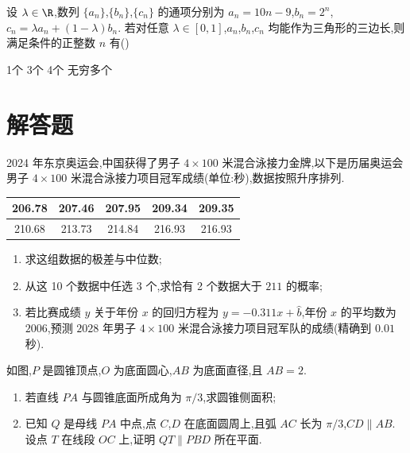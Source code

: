 \begin{problem}
设 \(\lambda\in\R\),数列 \(\{a_n\}\),\(\{b_n\}\),\(\{c_n\}\) 的通项分别为 \(a_n=10n-9\),\(b_n=2^n\),\(c_n=\lambda a_n+(1-\lambda)b_n\). 若对任意 \(\lambda\in[0,1]\),\(a_n\),\(b_n\),\(c_n\) 均能作为三角形的三边长,则满足条件的正整数 \(n\) 有(\quad)

\choices
    {1个}
    {3个}
    {4个}
    {无穷多个}
\end{problem}

\section{解答题}

\begin{problem}
2024 年东京奥运会,中国获得了男子 \(4\times100\) 米混合泳接力金牌,以下是历届奥运会男子 \(4\times100\) 米混合泳接力项目冠军成绩(单位:秒),数据按照升序排列.

\begin{center}
\begin{tabular}{|c|c|c|c|c|}
\hline
206.78 & 207.46 & 207.95 & 209.34 & 209.35 \\
\hline
210.68 & 213.73 & 214.84 & 216.93 & 216.93 \\
\hline
\end{tabular}
\end{center}

\begin{enumerate}
\item 求这组数据的极差与中位数;
\item 从这 10 个数据中任选 3 个,求恰有 2 个数据大于 \(211\) 的概率;
\item 若比赛成绩 \(y\) 关于年份 \(x\) 的回归方程为 \(y=-0.311x+\hat b\),年份 \(x\) 的平均数为 \(2006\),预测 \(2028\) 年男子 \(4\times100\) 米混合泳接力项目冠军队的成绩(精确到 \(0.01\) 秒).
\end{enumerate}
\end{problem}

\begin{problem}
如图,\(P\) 是圆锥顶点,\(O\) 为底面圆心,\(AB\) 为底面直径,且 \(AB=2\).
\begin{enumerate}
\item 若直线 \(PA\) 与圆锥底面所成角为 \(\pi/3\),求圆锥侧面积;
\item 已知 \(Q\) 是母线 \(PA\) 中点,点 \(C\),\(D\) 在底面圆周上,且弧 \(AC\) 长为 \(\pi/3\),\(CD\parallel AB\). 设点 \(T\) 在线段 \(OC\) 上,证明 \(QT\parallel PBD\) 所在平面.
\end{enumerate}

\end{problem}

